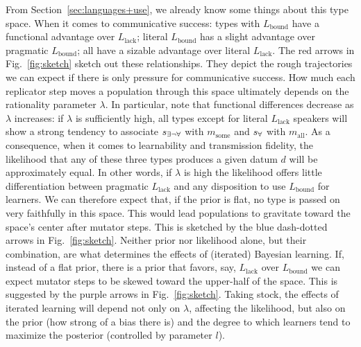 \documentclass[a4paper, 11pt]{article}
\theoremstyle{Satz}
\newcommand{\state}{\ensuremath{s}\xspace}		%
\newcommand{\mystate}[1]{\ensuremath{\state_{\text{#1}}}\xspace} %
\newcommand{\mylang}[1]{\ensuremath{L_{\text{#1}}}\xspace} %
\newcommand{\messg}{\ensuremath{m}\xspace}		%
\newcommand{\mymessg}[1]{\ensuremath{\messg_{\text{#1}}}\xspace} %
\newcommand{\ssome}{\mystate{\ensuremath{\exists\neg\forall}}}
\newcommand{\sall}{\mystate{\ensuremath{\forall}}}
\newcommand{\msome}{\mymessg{some}}
\newcommand{\mall}{\mymessg{all}}
\newcommand{\Lbound}{\mylang{bound}}
\newcommand{\Llack}{\mylang{lack}}
\begin{document}
From Section~\ref{sec:languages+use}, we already know some things about this type space. When it comes to communicative success: types with $\Lbound$ have a functional advantage over $\Llack$; literal $\Lbound$ has a slight advantage over pragmatic $\Lbound$; all have a sizable advantage over literal $\Llack$. The red arrows in Fig.~\ref{fig:sketch} sketch out these relationships. They depict the rough trajectories we can expect if there is only pressure for communicative success. How much each replicator step moves a population through this space ultimately depends on the rationality parameter $\lambda$. In particular, note that functional differences decrease as $\lambda$ increases: if $\lambda$ is sufficiently high, all types except for literal $\Llack$ speakers will show a strong tendency to associate $\ssome$ with $\msome$ and $\sall$ with $\mall$. As a consequence, when it comes to learnability and transmission fidelity, the likelihood that any of these three types produces a given datum $d$ will be approximately equal. In other words, if $\lambda$ is high the likelihood offers little differentiation between pragmatic $\Llack$ and any disposition to use $\Lbound$ for learners. We can therefore expect that, if the prior is flat, no type is passed on very faithfully in this space. This would lead populations to gravitate toward the space's center after mutator steps. This is sketched by the blue dash-dotted arrows in Fig.~\ref{fig:sketch}. Neither prior nor likelihood alone, but their combination, are what determines the effects of (iterated) Bayesian learning. If, instead of a flat prior, there is a prior that favors, say, $\Llack$ over $\Lbound$ we can expect mutator steps to be skewed toward the upper-half of the space. This is suggested by the purple arrows in Fig.~\ref{fig:sketch}. Taking stock, the effects of iterated learning will depend not only on $\lambda$, affecting the likelihood, but also on the prior (how strong of a bias there is) and the degree to which learners tend to maximize the posterior (controlled by parameter $l$). 
\end{document}
